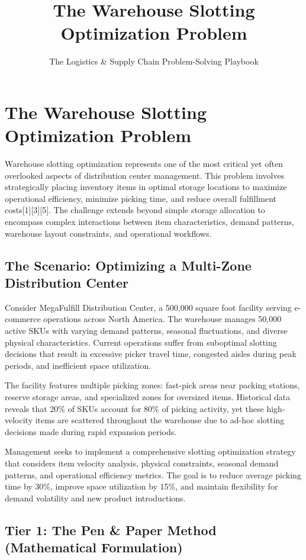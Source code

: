 \documentclass{article}
\title{The Warehouse Slotting Optimization Problem}
\author{The Logistics \& Supply Chain Problem-Solving Playbook}
\date{}
\begin{document}
\maketitle

\section{The Warehouse Slotting Optimization Problem}

Warehouse slotting optimization represents one of the most critical yet often overlooked aspects of distribution center management. This problem involves strategically placing inventory items in optimal storage locations to maximize operational efficiency, minimize picking time, and reduce overall fulfillment costs[1][3][5]. The challenge extends beyond simple storage allocation to encompass complex interactions between item characteristics, demand patterns, warehouse layout constraints, and operational workflows.

\subsection{The Scenario: Optimizing a Multi-Zone Distribution Center}

Consider MegaFulfill Distribution Center, a 500,000 square foot facility serving e-commerce operations across North America. The warehouse manages 50,000 active SKUs with varying demand patterns, seasonal fluctuations, and diverse physical characteristics. Current operations suffer from suboptimal slotting decisions that result in excessive picker travel time, congested aisles during peak periods, and inefficient space utilization.

The facility features multiple picking zones: fast-pick areas near packing stations, reserve storage areas, and specialized zones for oversized items. Historical data reveals that 20\% of SKUs account for 80\% of picking activity, yet these high-velocity items are scattered throughout the warehouse due to ad-hoc slotting decisions made during rapid expansion periods.

Management seeks to implement a comprehensive slotting optimization strategy that considers item velocity analysis, physical constraints, seasonal demand patterns, and operational efficiency metrics. The goal is to reduce average picking time by 30\%, improve space utilization by 15\%, and maintain flexibility for demand volatility and new product introductions.

\subsection{Tier 1: The Pen \& Paper Method (Mathematical Formulation)}
\end{document}
